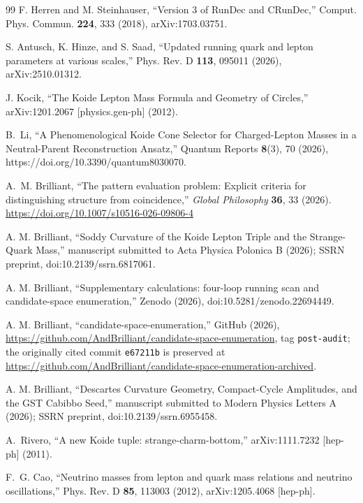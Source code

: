 \documentclass[aps,twocolumn,superscriptaddress,nofootinbib,floatfix]{revtex4-2}
\begin{document}
\begin{thebibliography}{99}
F. Herren and M. Steinhauser, ``Version 3 of RunDec and CRunDec,'' Comput. Phys. Commun. \textbf{224}, 333 (2018), arXiv:1703.03751.

S. Antusch, K. Hinze, and S. Saad, ``Updated running quark and lepton parameters at various scales,'' Phys. Rev. D \textbf{113}, 095011 (2026), arXiv:2510.01312.

J. Kocik, ``The Koide Lepton Mass Formula and Geometry of Circles,'' arXiv:1201.2067 [physics.gen-ph] (2012).

B.~Li, ``A Phenomenological Koide Cone Selector for Charged-Lepton Masses in a Neutral-Parent Reconstruction Ansatz,'' Quantum Reports \textbf{8}(3), 70 (2026), https://doi.org/10.3390/quantum8030070.

A.~M. Brilliant, ``The pattern evaluation problem: Explicit criteria for distinguishing structure from coincidence,'' \textit{Global Philosophy} \textbf{36}, 33 (2026). \url{https://doi.org/10.1007/s10516-026-09806-4}

A. M. Brilliant, ``Soddy Curvature of the Koide Lepton Triple and the Strange-Quark Mass,'' manuscript submitted to Acta Physica Polonica B (2026); SSRN preprint, doi:10.2139/ssrn.6817061.

A. M. Brilliant, ``Supplementary calculations: four-loop running scan and candidate-space enumeration,'' Zenodo (2026), doi:10.5281/zenodo.22694449.

A. M. Brilliant, ``candidate-space-enumeration,'' GitHub (2026),
\url{https://github.com/AndBrilliant/candidate-space-enumeration},
tag \texttt{post-audit}; the originally cited commit \texttt{e67211b}
is preserved at
\url{https://github.com/AndBrilliant/candidate-space-enumeration-archived}.

A. M. Brilliant, ``Descartes Curvature Geometry, Compact-Cycle Amplitudes, and the GST Cabibbo Seed,'' manuscript submitted to Modern Physics Letters A (2026); SSRN preprint, doi:10.2139/ssrn.6955458.

A.~Rivero, ``A new Koide tuple: strange-charm-bottom,'' arXiv:1111.7232 [hep-ph] (2011).

F.~G. Cao, ``Neutrino masses from lepton and quark mass relations and neutrino oscillations,'' Phys. Rev. D \textbf{85}, 113003 (2012), arXiv:1205.4068 [hep-ph].


\end{thebibliography}
\end{document}
